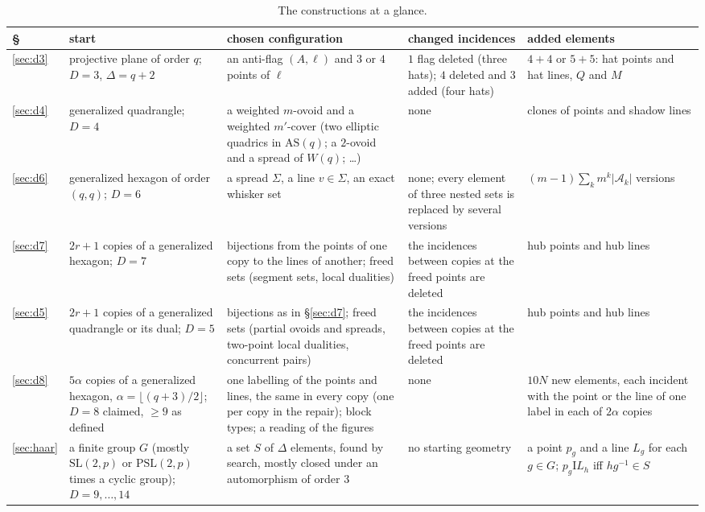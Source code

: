 \documentclass[11pt]{amsart}
\theoremstyle{definition}
\theoremstyle{remark}
\newcommand{\I}{\mathrel{\mathrm{I}}}
\newcommand{\cA}{\mathcal{A}}
\begin{document}
\begin{table}[ht]
\centering\small
\renewcommand{\arraystretch}{1.2}
\begin{tabular}{@{}>{\raggedright}p{}>{\raggedright}p{}>{\raggedright}p{}>{\raggedright}p{}>{\raggedright\arraybackslash}p{}@{}}
\toprule
\S & start & chosen configuration & changed incidences & added elements\\
\midrule
\ref{sec:d3} & projective plane of order $q$; $D=3$, $\Delta=q+2$ & an anti-flag $(A,\ell)$ and $3$ or $4$ points of $\ell$ & $1$ flag deleted (three hats); $4$ deleted and $3$ added (four hats) & $4+4$ or $5+5$: hat points and hat lines, $Q$ and $M$\\
\ref{sec:d4} & generalized quadrangle; $D=4$ & a weighted $m$-ovoid and a weighted $m'$-cover (two elliptic quadrics in $\mathrm{AS}(q)$; a $2$-ovoid and a spread of $W(q)$; \dots) & none & clones of points and shadow lines\\
\ref{sec:d6} & generalized hexagon of order $(q,q)$; $D=6$ & a spread $\Sigma$, a line $v\in\Sigma$, an exact whisker set & none; every element of three nested sets is replaced by several versions & $(m-1)\sum_k m^k\lvert\cA_k\rvert$ versions\\
\ref{sec:d7} & $2r+1$ copies of a generalized hexagon; $D=7$ & bijections from the points of one copy to the lines of another; freed sets (segment sets, local dualities) & the incidences between copies at the freed points are deleted & hub points and hub lines\\
\ref{sec:d5} & $2r+1$ copies of a generalized quadrangle or its dual; $D=5$ & bijections as in \S\ref{sec:d7}; freed sets (partial ovoids and spreads, two-point local dualities, concurrent pairs) & the incidences between copies at the freed points are deleted & hub points and hub lines\\
\ref{sec:d8} & $5\alpha$ copies of a generalized hexagon, $\alpha=\lfloor(q+3)/2\rfloor$; $D=8$ claimed, $\ge9$ as defined & one labelling of the points and lines, the same in every copy (one per copy in the repair); block types; a reading of the figures & none & $10N$ new elements, each incident with the point or the line of one label in each of $2\alpha$ copies\\
\ref{sec:haar} & a finite group $G$ (mostly $\mathrm{SL}(2,p)$ or $\mathrm{PSL}(2,p)$ times a cyclic group); $D=9,\dots,14$ & a set $S$ of $\Delta$ elements, found by search, mostly closed under an automorphism of order $3$ & no starting geometry & a point $p_g$ and a line $L_g$ for each $g\in G$; $p_g\I L_h$ iff $hg^{-1}\in S$\\
\bottomrule
\end{tabular}
\caption{The constructions at a glance.}
\label{tab:overview}
\end{table}
\end{document}
